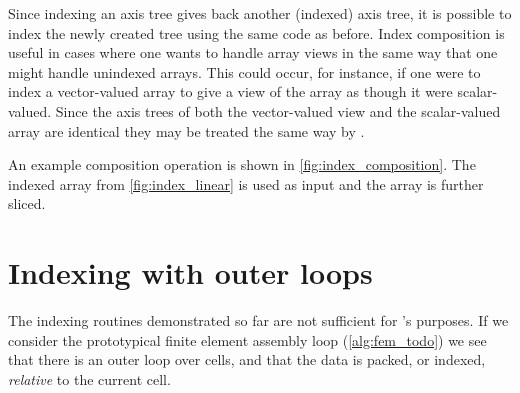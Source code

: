 \documentclass[thesis]{subfiles}
\begin{document}
Since indexing an axis tree gives back another (indexed) axis tree, it is possible to index the newly created tree using the same code as before.
Index composition is useful in cases where one wants to handle array views in the same way that one might handle unindexed arrays.
This could occur, for instance, if one were to index a vector-valued array to give a view of the array as though it were scalar-valued.
Since the axis trees of both the vector-valued view and the scalar-valued array are identical they may be treated the same way by .

An example composition operation is shown in \cref{fig:index_composition}.
The indexed array from \cref{fig:index_linear} is used as input and the array is further sliced.



\section{Indexing with outer loops}
\label{sec:outer_loops}

The indexing routines demonstrated so far are not sufficient for 's purposes.
If we consider the prototypical finite element assembly loop (\cref{alg:fem_todo}) we see that there is an outer loop over cells, and that the data is packed, or indexed, \textit{relative} to the current cell.




\end{document}
